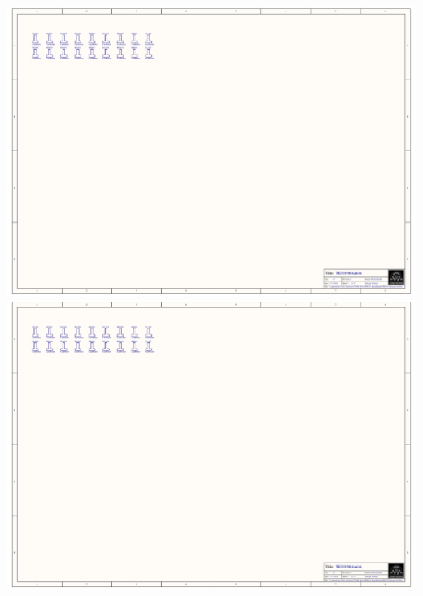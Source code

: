 \includegraphics[page=8,angle=270,height=\textheight,width=\textwidth,keepaspectratio]{TK510_Signalbakplan.PDF}
\includegraphics[page=9,angle=270,height=\textheight,width=\textwidth,keepaspectratio]{TK510_Signalbakplan.PDF}

